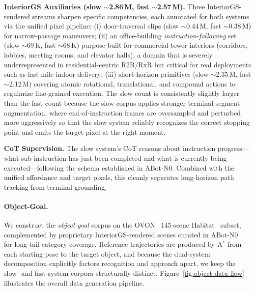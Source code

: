 \textbf{InteriorGS Auxiliaries (slow $\sim$2.86\,M, fast $\sim$2.57\,M).}
Three InteriorGS-rendered streams sharpen specific competencies,
each annotated for both systems via the unified pixel pipeline:
(i) door-traversal clips (slow $\sim$0.44\,M, fast $\sim$0.38\,M)
for narrow-passage maneuvers; (ii) an office-building
\textit{instruction-following} set (slow $\sim$69\,K, fast $\sim$68\,K)
purpose-built for commercial-tower interiors (corridors, lobbies,
meeting rooms, and elevator halls), a domain that is severely
underrepresented in residential-centric R2R/RxR but critical for
real deployments such as last-mile indoor delivery;
(iii) short-horizon primitives (slow $\sim$2.35\,M, fast
$\sim$2.12\,M) covering atomic rotational, translational, and
compound actions to regularize fine-grained execution. The slow
count is consistently slightly larger than the fast count because
the slow corpus applies stronger terminal-segment
augmentation, where end-of-instruction frames are oversampled and
perturbed more aggressively so that the slow system reliably
recognizes the correct stopping point and emits the target pixel
at the right moment.

\textbf{CoT Supervision.}
The slow system's CoT reasons about instruction progress---what
sub-instruction has just been completed and what is currently being
executed---following the schema established in
ABot-N0. Combined with the unified affordance and target pixels,
this cleanly separates long-horizon path tracking from terminal
grounding.


\paragraph{Object-Goal.}
We construct the \textit{object-goal} corpus on the
OVON~\cite{yokoyama2024hmovon} 145-scene
Habitat~\cite{savva2019habitat} subset, complemented by proprietary
InteriorGS-rendered scenes curated in ABot-N0~\cite{abotn0} for
long-tail category coverage. Reference trajectories are produced
by A$^{\!*}$ from each starting pose to the target object, and
because the dual-system decomposition explicitly factors recognition
and approach apart, we keep the slow- and fast-system corpora
structurally distinct. Figure~\ref{fig:object-data-flow}
illustrates the overall data generation pipeline.

